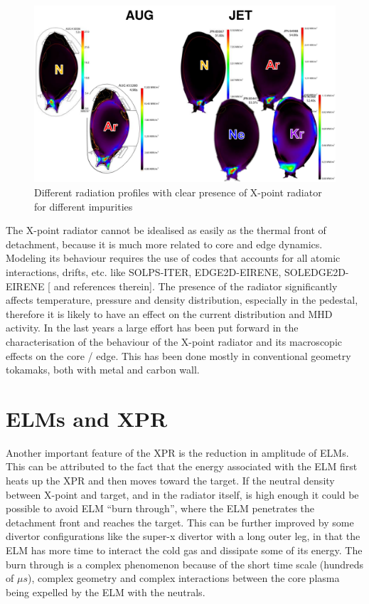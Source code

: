 \begin{figure}[!ht]
	\centering
	\includegraphics[width=\linewidth]{Chapters/chapter1/figs/xprs.png}
	\caption{Different radiation profiles with clear presence of X-point radiator for different impurities
	\cite{Wiesen2017}}
	\label{fig:xprs}
\end{figure}

The X-point radiator cannot be idealised as easily as the thermal front of detachment, because it is much more related to core and edge dynamics. Modeling its behaviour requires the use of codes that accounts for all atomic interactions, drifts, etc. like SOLPS-ITER, EDGE2D-EIRENE, SOLEDGE2D-EIRENE [\cite{Wiesen2017a} and references therein]. The presence of the radiator significantly affects temperature, pressure and density distribution, especially in the pedestal, therefore it is likely to have an effect on the current distribution and MHD activity.
In the last years a large effort has been put forward in the characterisation of the behaviour of the X-point radiator and its macroscopic effects on the core / edge. This has been done mostly in conventional geometry tokamaks, both with metal and carbon wall.


\section{ELMs and XPR}
Another important feature of the XPR is the reduction in amplitude of ELMs. This can be attributed to the fact that the energy associated with the ELM first heats up the XPR and then moves toward the target. If the neutral density between X-point and target, and in the radiator itself, is high enough it could be possible to avoid ELM “burn through”, where the ELM penetrates the detachment front and reaches the target. \cite{Krasheninnikov2016} This can be further improved by some divertor configurations like the super-x divertor with a long outer leg, in that the ELM has more time to interact the cold gas and dissipate some of its energy. The burn through is a complex phenomenon because of the short time scale (hundreds of $\mu s$), complex geometry and complex interactions between the core plasma being expelled by the ELM with the neutrals.

